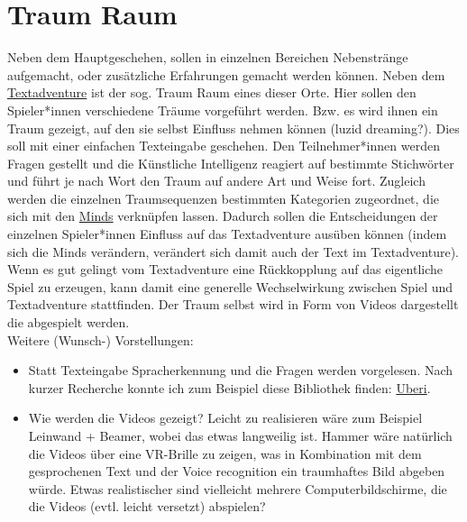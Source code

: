 \documentclass[12pt, a4paper, openany]{report}
\begin{document}
\chapter{Traum Raum}
Neben dem Hauptgeschehen, sollen in einzelnen Bereichen Nebenstränge aufgemacht, oder zusätzliche Erfahrungen gemacht werden können. 
Neben dem \hyperref[textadventure]{Textadventure} ist der sog. \glqq Traum Raum\grqq{} eines dieser Orte.
Hier sollen den Spieler*innen verschiedene Träume vorgeführt werden. 
Bzw. es wird ihnen ein Traum gezeigt, auf den sie selbst Einfluss nehmen können (luzid dreaming?).
Dies soll mit einer einfachen Texteingabe geschehen.
Den Teilnehmer*innen werden Fragen gestellt und die \glqq Künstliche Intelligenz\grqq{} reagiert auf bestimmte Stichwörter und führt je nach Wort den Traum auf andere Art und Weise fort.
Zugleich werden die einzelnen Traumsequenzen bestimmten Kategorien zugeordnet, die sich mit den \hyperref[minds]{Minds} verknüpfen lassen.
Dadurch sollen die Entscheidungen der einzelnen Spieler*innen Einfluss auf das Textadventure ausüben können (indem sich die Minds verändern, verändert sich damit auch der Text im Textadventure).
Wenn es gut gelingt vom Textadventure eine Rückkopplung auf das eigentliche Spiel zu erzeugen, kann damit eine generelle Wechselwirkung zwischen Spiel und Textadventure stattfinden.
Der Traum selbst wird in Form von Videos dargestellt die abgespielt werden.\\

Weitere (Wunsch-) Vorstellungen:
\begin{itemize}
\item Statt Texteingabe Spracherkennung und die Fragen werden vorgelesen.
    Nach kurzer Recherche konnte ich zum Beispiel diese Bibliothek finden: \href{https://github.com/Uberi/speech_recognition}{Uberi}. 
\item Wie werden die Videos gezeigt? 
    Leicht zu realisieren wäre zum Beispiel Leinwand + Beamer, wobei das etwas langweilig ist. 
    Hammer wäre natürlich die Videos über eine VR-Brille zu zeigen, was in Kombination mit dem gesprochenen Text und der Voice recognition ein \glqq traumhaftes\grqq{} Bild abgeben würde.
    Etwas realistischer sind vielleicht mehrere Computerbildschirme, die die Videos (evtl. leicht versetzt) abspielen? 
\end{itemize}
\end{document}
